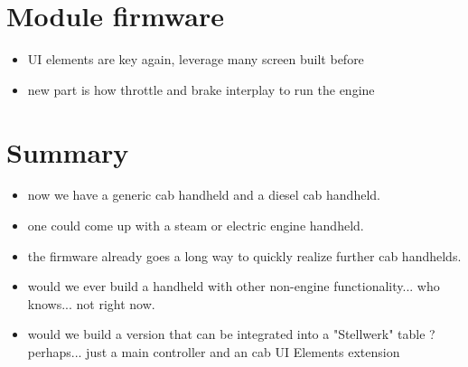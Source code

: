 \section{Module firmware}

\begin{itemize}
\item UI elements are key again, leverage many screen built before
\item new part is how throttle and brake interplay to run the engine
\end{itemize}


\section{Summary}

\begin{itemize}
\item now we have a generic cab handheld and a diesel cab handheld.
\item one could come up with a steam or electric engine handheld. 
\item the firmware already goes a long way to quickly realize further cab handhelds.
\item would we ever build a handheld with other non-engine functionality... who knows... not right now.
\item would we build a version that can be integrated into a "Stellwerk" table ? perhaps... just a main controller and an cab UI Elements extension
\end{itemize}
